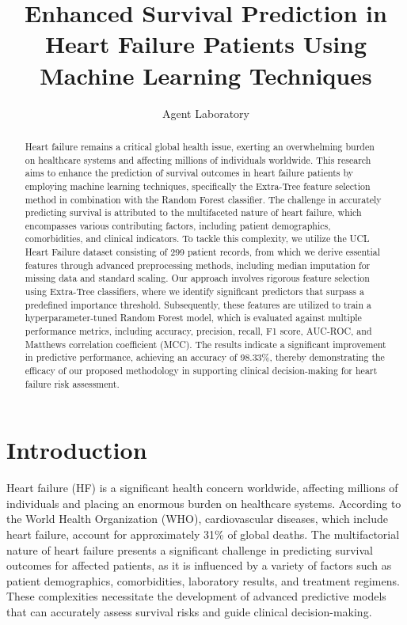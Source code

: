 \documentclass{article}
\title{Enhanced Survival Prediction in Heart Failure Patients Using Machine Learning Techniques}
\author{Agent Laboratory}
\date{}
\begin{document}
\maketitle

\begin{abstract}
Heart failure remains a critical global health issue, exerting an overwhelming burden on healthcare systems and affecting millions of individuals worldwide. This research aims to enhance the prediction of survival outcomes in heart failure patients by employing machine learning techniques, specifically the Extra-Tree feature selection method in combination with the Random Forest classifier. The challenge in accurately predicting survival is attributed to the multifaceted nature of heart failure, which encompasses various contributing factors, including patient demographics, comorbidities, and clinical indicators. To tackle this complexity, we utilize the UCL Heart Failure dataset consisting of 299 patient records, from which we derive essential features through advanced preprocessing methods, including median imputation for missing data and standard scaling. Our approach involves rigorous feature selection using Extra-Tree classifiers, where we identify significant predictors that surpass a predefined importance threshold. Subsequently, these features are utilized to train a hyperparameter-tuned Random Forest model, which is evaluated against multiple performance metrics, including accuracy, precision, recall, F1 score, AUC-ROC, and Matthews correlation coefficient (MCC). The results indicate a significant improvement in predictive performance, achieving an accuracy of 98.33\%, thereby demonstrating the efficacy of our proposed methodology in supporting clinical decision-making for heart failure risk assessment.
\end{abstract}

\section{Introduction}
Heart failure (HF) is a significant health concern worldwide, affecting millions of individuals and placing an enormous burden on healthcare systems. According to the World Health Organization (WHO), cardiovascular diseases, which include heart failure, account for approximately 31\% of global deaths. The multifactorial nature of heart failure presents a significant challenge in predicting survival outcomes for affected patients, as it is influenced by a variety of factors such as patient demographics, comorbidities, laboratory results, and treatment regimens. These complexities necessitate the development of advanced predictive models that can accurately assess survival risks and guide clinical decision-making.
\end{document}
